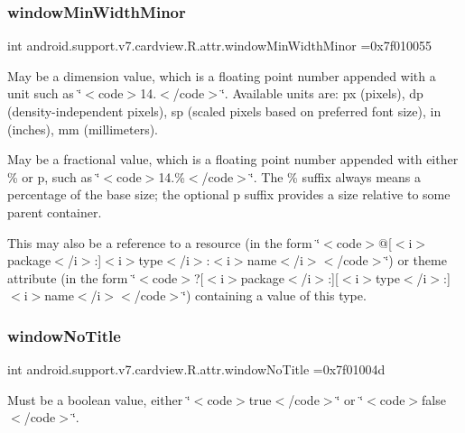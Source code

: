 \subsubsection{\texorpdfstring{window\+Min\+Width\+Minor}{windowMinWidthMinor}}
{\footnotesize\ttfamily int android.\+support.\+v7.\+cardview.\+R.\+attr.\+window\+Min\+Width\+Minor =0x7f010055\hspace{0.3cm}{\ttfamily [static]}}

May be a dimension value, which is a floating point number appended with a unit such as \char`\"{}$<$code$>$14.\+5sp$<$/code$>$\char`\"{}. Available units are\+: px (pixels), dp (density-\/independent pixels), sp (scaled pixels based on preferred font size), in (inches), mm (millimeters). 

May be a fractional value, which is a floating point number appended with either \% or p, such as \char`\"{}$<$code$>$14.\%$<$/code$>$\char`\"{}. The \% suffix always means a percentage of the base size; the optional p suffix provides a size relative to some parent container. 

This may also be a reference to a resource (in the form \char`\"{}$<$code$>$@\mbox{[}$<$i$>$package$<$/i$>$\+:\mbox{]}$<$i$>$type$<$/i$>$\+:$<$i$>$name$<$/i$>$$<$/code$>$\char`\"{}) or theme attribute (in the form \char`\"{}$<$code$>$?\mbox{[}$<$i$>$package$<$/i$>$\+:\mbox{]}\mbox{[}$<$i$>$type$<$/i$>$\+:\mbox{]}$<$i$>$name$<$/i$>$$<$/code$>$\char`\"{}) containing a value of this type. \mbox{\label{classandroid_1_1support_1_1v7_1_1cardview_1_1R_1_1attr_a874ce217d920846ce7cdff9d2841822b}} 
\subsubsection{\texorpdfstring{window\+No\+Title}{windowNoTitle}}
{\footnotesize\ttfamily int android.\+support.\+v7.\+cardview.\+R.\+attr.\+window\+No\+Title =0x7f01004d\hspace{0.3cm}{\ttfamily [static]}}

Must be a boolean value, either \char`\"{}$<$code$>$true$<$/code$>$\char`\"{} or \char`\"{}$<$code$>$false$<$/code$>$\char`\"{}. 

